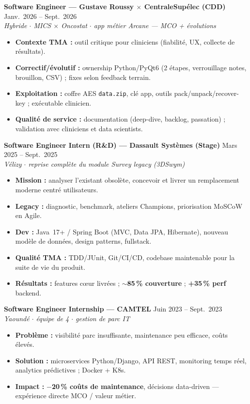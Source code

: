 \documentclass[10pt,a4paper]{article}
\begin{document}
\textbf{Software Engineer --- Gustave Roussy $\times$ CentraleSupélec (CDD)} \hfill Janv.\ 2026 -- Sept.\ 2026\\
{\small\textit{Hybride $\cdot$ MICS $\times$ Oncostat $\cdot$ app métier Arcane --- MCO + évolutions}}
\begin{itemize}
  \item \textbf{Contexte TMA :} outil critique pour cliniciens (fiabilité, UX, collecte de résultats).
  \item \textbf{Correctif/évolutif :} ownership Python/PyQt6 (2 étapes, verrouillage notes, brouillon, CSV) ; fixes selon feedback terrain.
  \item \textbf{Exploitation :} coffre AES \texttt{data.zip}, clé app, outils pack/unpack/recover-key ; exécutable clinicien.
  \item \textbf{Qualité de service :} documentation (deep-dive, backlog, passation) ; validation avec cliniciens et data scientists.
\end{itemize}

\textbf{Software Engineer Intern (R\&D) --- Dassault Systèmes (Stage)} \hfill Mars 2025 -- Sept.\ 2025\\
{\small\textit{Vélizy $\cdot$ reprise complète du module Survey legacy (3DSwym)}}
\begin{itemize}
  \item \textbf{Mission :} analyser l'existant obsolète, concevoir et livrer un remplacement moderne centré utilisateurs.
  \item \textbf{Legacy :} diagnostic, benchmark, ateliers Champions, priorisation MoSCoW en Agile.
  \item \textbf{Dev :} Java~17+ / Spring Boot (MVC, Data JPA, Hibernate), nouveau modèle de données, design patterns, fullstack.
  \item \textbf{Qualité TMA :} TDD/JUnit, Git/CI/CD, codebase maintenable pour la suite de vie du produit.
  \item \textbf{Résultats :} features cœur livrées ; $\sim$\textbf{85\,\% couverture} ; \textbf{+35\,\% perf} backend.
\end{itemize}

\textbf{Software Engineer Internship --- CAMTEL} \hfill Juin 2023 -- Sept.\ 2023\\
{\small\textit{Yaoundé $\cdot$ équipe de 4 $\cdot$ gestion de parc IT}}
\begin{itemize}
  \item \textbf{Problème :} visibilité parc insuffisante, maintenance peu efficace, coûts élevés.
  \item \textbf{Solution :} microservices Python/Django, API REST, monitoring temps réel, analytics prédictives ; Docker + K8s.
  \item \textbf{Impact :} \textbf{$-$20\,\% coûts de maintenance}, décisions data-driven --- expérience directe MCO / valeur métier.
\end{itemize}
\end{document}
